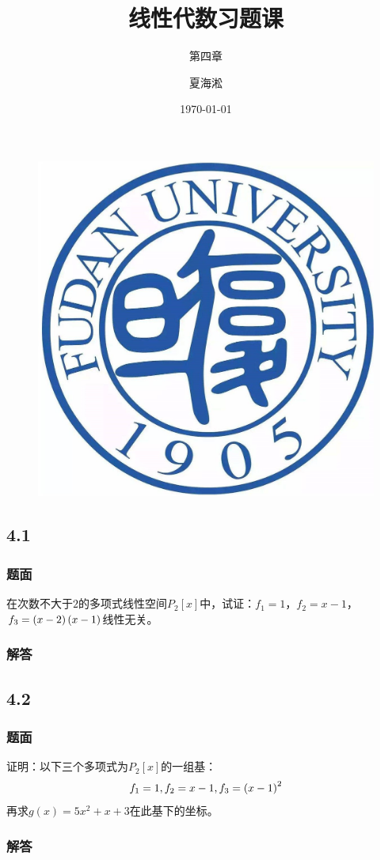 \documentclass{beamer}
\author{夏海淞}
\title{线性代数习题课}
\subtitle{第四章}
\date{\today}
\begin{document}
\setlength{\parskip}{0.45\baselineskip}

\begin{frame}
    \titlepage
    \begin{figure}[htpb]
        \begin{center}
            \vspace*{-0.5cm}
            \includegraphics[width=0.1\linewidth]{pic/FDU.jpeg}
        \end{center}
    \end{figure}

\end{frame}

\subsection*{4.1}
\begin{frame}
    \frametitle{题面}

    在次数不大于\(2\)的多项式线性空间\(P_2[x]\)中，试证：\(f_1=1\)，\(f_2=x-1\)，\(f_3=\left( x-2 \right)\left( x-1 \right)\)线性无关。

\end{frame}

\begin{frame}
    \frametitle{解答}



\end{frame}

\subsection*{4.2}
\begin{frame}
    \frametitle{题面}

    证明：以下三个多项式为\(P_2[x]\)的一组基：
    \begin{equation*}
        f_1=1,f_2=x-1,f_3=\left( x-1 \right)^2
    \end{equation*}
    再求\(g(x)=5x^2+x+3\)在此基下的坐标。

\end{frame}

\begin{frame}
    \frametitle{解答}



\end{frame}
\end{document}
